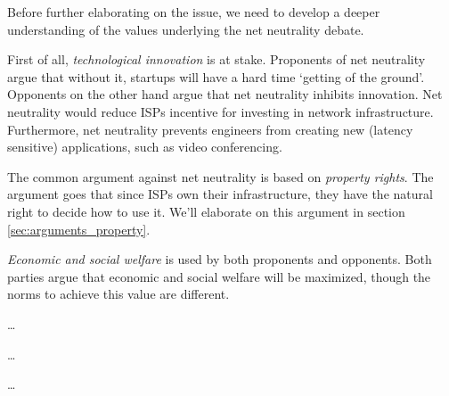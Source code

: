 
Before further elaborating on the issue, we need to develop a deeper understanding of the values underlying the net neutrality debate.

First of all, \emph{technological innovation} is at stake. Proponents of net neutrality argue that without it, startups will have a hard time `getting of the ground'. Opponents on the other hand argue that net neutrality inhibits innovation. Net neutrality would reduce ISPs incentive for investing in network infrastructure. Furthermore, net neutrality prevents engineers from creating new (latency sensitive) applications, such as video conferencing.

The common argument against net neutrality is based on \emph{property rights}. The argument goes that since ISPs own their infrastructure, they have the natural right to decide how to use it. We'll elaborate on this argument in section \ref{sec:arguments_property}.

\emph{Economic and social welfare} is used by both proponents and opponents. Both parties argue that economic and social welfare will be maximized, though the norms to achieve this value are different.

\ldots

\ldots

\ldots